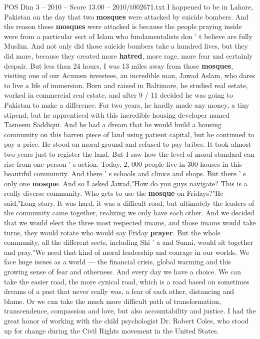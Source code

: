 \begin{textsample}{POS Dim 3 – 2010 – Score 13.00 – 2010/t002671.txt}
I happened to be in Lahore, Pakistan on the day that two \textbf{mosques} were attacked by suicide bombers.
And the reason these \textbf{mosques} were attacked is because the people praying inside were from a particular sect of Islam who fundamentalists don ' t believe are fully Muslim.
And not only did those suicide bombers take a hundred lives, but they did more, because they created more \textbf{hatred}, more rage, more fear and certainly despair.
But less than 24 hours, I was 13 miles away from those \textbf{mosques}, visiting one of our Acumen investees, an incredible man, Jawad Aslam, who dares to live a life of immersion.
Born and raised in Baltimore, he studied real estate, worked in commercial real estate, and after 9 / 11 decided he was going to Pakistan to make a difference.
For two years, he hardly made any money, a tiny stipend, but he apprenticed with this incredible housing developer named Tasneem Saddiqui.
And he had a dream that he would build a housing community on this barren piece of land using patient capital, but he continued to pay a price.
He stood on moral ground and refused to pay bribes.
It took almost two years just to register the land.
But I saw how the level of moral standard can rise from one person ' s action.
Today, 2, 000 people live in 300 houses in this beautiful community.
And there ' s schools and clinics and shops.
But there ' s only one \textbf{mosque}.
And so I asked Jawad,"How do you guys navigate?
This is a really diverse community.
Who gets to use the \textbf{mosque} on Fridays?"He said,"Long story.
It was hard, it was a difficult road, but ultimately the leaders of the community came together, realizing we only have each other.
And we decided that we would elect the three most respected imams, and those imams would take turns, they would rotate who would say Friday \textbf{prayer}.
But the whole community, all the different sects, including Shi ' a and Sunni, would sit together and pray."We need that kind of moral leadership and courage in our worlds.
We face huge issues as a world — the financial crisis, global warming and this growing sense of fear and otherness.
And every day we have a choice.
We can take the easier road, the more cynical road, which is a road based on sometimes dreams of a past that never really was, a fear of each other, distancing and blame.
Or we can take the much more difficult path of transformation, transcendence, compassion and love, but also accountability and justice.
I had the great honor of working with the child psychologist Dr.
Robert Coles, who stood up for change during the Civil Rights movement in the United States.

\end{textsample}
